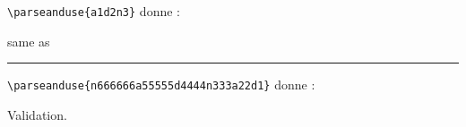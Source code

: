 \documentclass{article}
\begin{document}
\verb+\parseanduse{a1d2n3}+ donne : \newline


same as \newline



\rule{\textwidth}{1pt}

\bigskip


\verb+\parseanduse{n666666a55555d4444n333a22d1}+ donne : \newline


Validation. \newline

\end{document}
